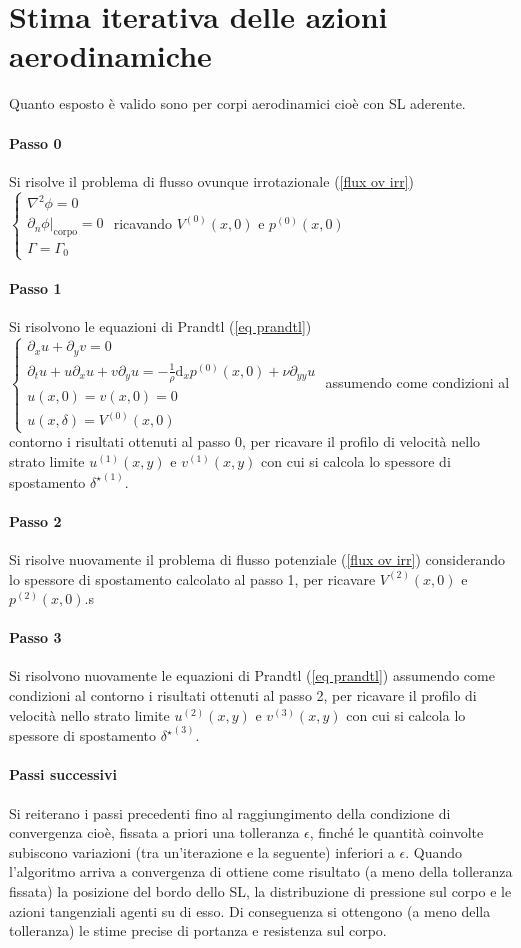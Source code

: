 \documentclass[11pt,a4paper]{report}
\newcommand{\de}{\mathrm d}
\begin{document}
{\let\clearpage\relax \chapter{Stima iterativa delle azioni aerodinamiche}
Quanto esposto è valido sono per corpi aerodinamici cioè con SL aderente.
	\subsubsection{Passo 0}
	Si risolve il problema di flusso ovunque irrotazionale (\ref{flux ov irr}) $\begin{cases}\nabla^2\phi=0\\\partial_n\phi\vert_{\text{corpo}}=0\\\Gamma=\Gamma_0\end{cases}$ ricavando $V^{(0)}(x,0)$ e $p^{(0)}(x,0)$
	\subsubsection{Passo 1}
	Si risolvono le equazioni di Prandtl (\ref{eq prandtl}) $\begin{cases}\partial_xu+\partial_yv=0\\\partial_tu+u\partial_xu+v\partial_yu=-\frac 1\rho\de _xp^{(0)}(x,0)+\nu\partial_{yy}u\\u(x,0)=v(x,0)=0\\u(x,\delta)=V^{(0)}(x,0)\end{cases}$ assumendo come condizioni al contorno i risultati ottenuti al passo 0, per ricavare il profilo di velocità nello strato limite $u^{(1)}(x,y)$ e $v^{(1)}(x,y)$ con cui si calcola lo spessore di spostamento ${\delta^\star}^{(1)}$.
	\subsubsection{Passo 2}
	Si risolve nuovamente il problema di flusso potenziale (\ref{flux ov irr}) considerando lo spessore di spostamento calcolato al passo 1, per ricavare $V^{(2)}(x,0)$ e $p^{(2)}(x,0)$.s
	\subsubsection{Passo 3}
	Si risolvono nuovamente le equazioni di Prandtl (\ref{eq prandtl}) assumendo come condizioni al contorno i risultati ottenuti al passo 2, per ricavare il profilo di velocità nello strato limite $u^{(2)}(x,y)$ e $v^{(3)}(x,y)$ con cui si calcola lo spessore di spostamento ${\delta^\star}^{(3)}$.
	\subsubsection{Passi successivi}
	Si reiterano i passi precedenti fino al raggiungimento della condizione di convergenza cioè, fissata a priori una tolleranza $\epsilon$, finché le quantità coinvolte subiscono variazioni (tra un'iterazione e la seguente) inferiori a $\epsilon$. Quando l'algoritmo arriva a convergenza di ottiene come risultato (a meno della tolleranza fissata) la posizione del bordo dello SL, la distribuzione di pressione sul corpo e le azioni tangenziali agenti su di esso. Di conseguenza si ottengono (a meno della tolleranza) le stime precise di portanza e resistenza sul corpo.
}
	
\end{document}
